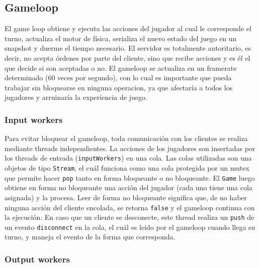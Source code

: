 \subsection{Gameloop}

El game loop obtiene y ejecuta las acciones del jugador al cual le corresponde el turno, actualiza el motor de f\'isica,
serializa el nuevo estado del juego en un snapshot y duerme el tiempo necesario. El servidor es totalmente autoritario,
es decir, no acepta \'ordenes por parte del cliente, sino que recibe acciones y es \'el el que decide si son
aceptadas o no. El gameloop se actualiza en un framerate determinado (60 veces por segundo), con lo cual es importante
que pueda trabajar sin bloquearse en ninguna operacion, ya que afectar\'ia a todos los jugadores y arruinar\'ia la
experiencia de juego.


\subsubsection{Input workers}

Para evitar bloquear el gameloop, toda comunicaci\'on con los clientes se realiza mediante threads independientes. La acciones de los jugadores
son insertadas por los threads de entrada (\texttt{inputWorkers}) en una cola. Las colas utilizadas son
una objetos de tipo \texttt{Stream}, el cu\'al funciona como una cola protegida por un mutex que permite
hacer \texttt{pop} tanto en forma bloqueante o no bloqueante. El \texttt{Game} luego obtiene
en forma no bloqueante una acci\'on del jugador (cada uno tiene una cola asignada) y la procesa. Leer de forma
no bloqueante significa que, de no haber ninguna acci\'on del cliente encolada, se retorna \texttt{false} y
el gameloop continua con la ejecuci\'on. En caso que un cliente se desconecte, este thread realiza un \texttt{push}
de un evento \texttt{disconnect} en la cola, el cu\'al es leido por el gameloop cuando llega su turno, y maneja
el evento de la forma que corresponda.


\subsubsection{Output workers}

